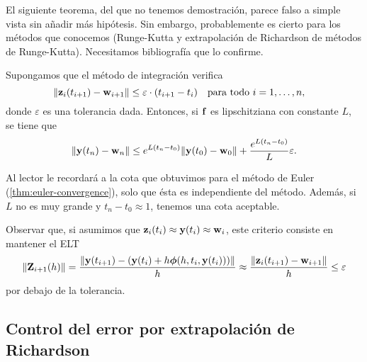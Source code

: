\begin{editorial}
    El siguiente teorema, del que no tenemos demostración,
    parece falso a simple vista sin añadir más hipótesis.
    Sin embargo, probablemente es cierto para los métodos que conocemos
    (Runge-Kutta y extrapolación de Richardson de métodos de Runge-Kutta).
    Necesitamos bibliografía que lo confirme.
\end{editorial}

\begin{theorem}\label{thm:global-err}
    Supongamos que el método de integración verifica
    \begin{equation*}
        \norm{\vz_i(t_{i+1}) - \vw_{i+1}} \leq \varepsilon\cdot (t_{i+1}-t_i)
            \qq{para todo $i = 1,\ldots,n$,}
    \end{equation*}
    donde $\varepsilon$ es una tolerancia dada.
    Entonces, si $\vb{f}{}$ es lipschitziana con constante $L$, se tiene que 
    \begin{equation*}
        \norm{\vb{y}{}(t_n) - \vb{w}{}_n} \leq e^{L(t_n - t_0)}\norm{\vb{y}{}(t_0) - \vb{w}{}_0}
            + \frac{e^{L(t_n - t_0)}}{L}\varepsilon.
    \end{equation*}
\end{theorem}

\begin{remark}
    Al lector le recordará a la cota que obtuvimos para el método de Euler
    (\cref{thm:euler-convergence}),
    solo que ésta es independiente del método.
    Además, si $L$ no es muy grande y $t_n - t_0 \approx 1$,
    tenemos una cota aceptable.
\end{remark}

\begin{remark}
    Observar que, si asumimos que $\vb{z}{}_i(t_i) \approx \vb{y}{}(t_i) \approx \vb{w}{}_i $,
    este criterio consiste en mantener el ELT
    \begin{equation*}
        \norm{\vb{Z}{}_{i+1}(h)} =
        \frac{\norm{\vb{y}{}(t_{i+1}) - (\vb{y}{}(t_i) + h\vb*{\phi}{}(h, t_i, \vb{y}{}(t_i)))}}{h}
        \approx \frac{\norm{\vb{z}{}_i(t_{i+1}) - \vb{w}{}_{i+1}}}{h} \le \varepsilon
    \end{equation*}
    por debajo de la tolerancia.
\end{remark}

\subsection{Control del error por extrapolación de Richardson}

